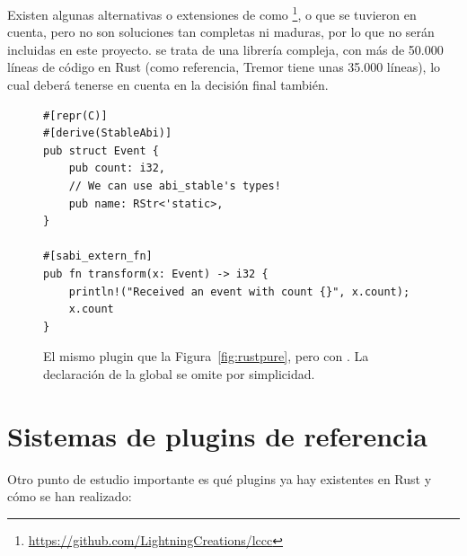 Existen algunas alternativas o extensiones de \abistable como
\footnote{\url{https://github.com/LightningCreations/lccc}},
 o  que se tuvieron en cuenta, pero no son
soluciones tan completas ni maduras, por lo que no serán incluidas en este
proyecto. \abistable se trata de una librería compleja, con más de 50.000 líneas
de código en Rust (como referencia, Tremor tiene unas 35.000 líneas), lo cual
deberá tenerse en cuenta en la decisión final también.

\begin{figure}
    \centering
    \begin{verbatim}
#[repr(C)]
#[derive(StableAbi)]
pub struct Event {
    pub count: i32,
    // We can use abi_stable's types!
    pub name: RStr<'static>,
}

#[sabi_extern_fn]
pub fn transform(x: Event) -> i32 {
    println!("Received an event with count {}", x.count);
    x.count
}
    \end{verbatim}

    \caption{El mismo plugin que la Figura~\ref{fig:rustpure}, pero con
        \abistable. La declaración de la global  se omite por
        simplicidad.}%
    \label{fig:rustabi_stable}
\end{figure}

\section{Sistemas de plugins de referencia}

Otro punto de estudio importante es qué plugins ya hay existentes en Rust y cómo
se han realizado:

